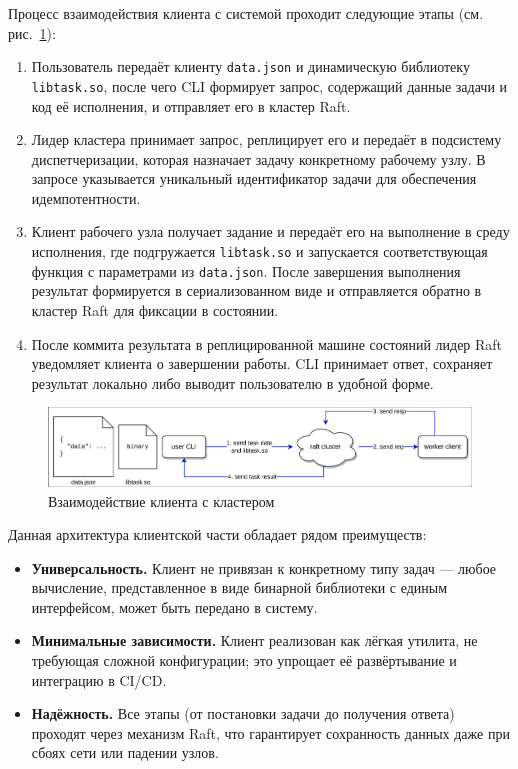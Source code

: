 Процесс взаимодействия клиента с системой проходит следующие этапы (см.
рис.~\ref{fig:client-arch}):
\begin{enumerate}
    \item Пользователь передаёт клиенту \texttt{data.json} и
    динамическую библиотеку \texttt{libtask.so}, после чего CLI
    формирует запрос, содержащий данные задачи и код её исполнения,
    и отправляет его в кластер Raft.
    \item Лидер кластера принимает запрос, реплицирует его
    и передаёт в подсистему диспетчеризации, которая назначает
    задачу конкретному рабочему узлу. В запросе указывается
    уникальный идентификатор задачи для обеспечения идемпотентности.
    \item Клиент рабочего узла получает задание и передаёт его на выполнение
    в среду исполнения, где подгружается \texttt{libtask.so} и
    запускается соответствующая функция с параметрами из \texttt{data.json}.
    После завершения выполнения результат формируется в сериализованном
    виде и отправляется обратно в кластер Raft для фиксации в состоянии.
    \item После коммита результата в реплицированной машине состояний
    лидер Raft уведомляет клиента о завершении работы. CLI принимает
    ответ, сохраняет результат локально либо выводит пользователю
    в удобной форме.
\end{enumerate}

\begin{figure}
  \centering
  \includegraphics[scale=0.25]{inc/client-arch.png}
  \caption{Взаимодействие клиента с кластером}
  \label{fig:client-arch}
\end{figure}

Данная архитектура клиентской части обладает рядом преимуществ:
\begin{itemize}
    \item \textbf{Универсальность.} Клиент не привязан к конкретному
    типу задач — любое вычисление, представленное в виде бинарной
    библиотеки с единым интерфейсом, может быть передано в систему.
    \item \textbf{Минимальные зависимости.} Клиент реализован как
    лёгкая утилита, не требующая сложной конфигурации;
    это упрощает её развёртывание и интеграцию в CI/CD.
    \item \textbf{Надёжность.} Все этапы (от постановки задачи до
    получения ответа) проходят через механизм Raft, что гарантирует
    сохранность данных даже при сбоях сети или падении узлов.
\end{itemize}

